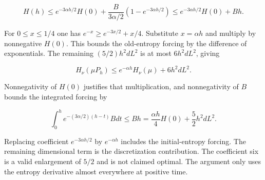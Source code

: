 \documentclass[11pt,a4paper]{report}
\begin{document}
\[H(h)\le e^{-3\alpha h/2}H(0)+\frac B{3\alpha/2}(1-e^{-3\alpha h/2})
\le e^{-3\alpha h/2}H(0)+Bh.\]

For \(0\le x\le1/4\) one has \(e^{-x}\ge e^{-3x/2}+x/4\). Substitute \(x=\alpha h\) and multiply by nonnegative \(H(0)\). This bounds the old-entropy forcing by the difference of exponentials. The remaining \((5/2)h^2dL^2\) is at most \(6h^2dL^2\), giving

\[\boxed{H_\nu(\mu P_h)\le e^{-\alpha h}H_\nu(\mu)+6h^2dL^2.}\]

Nonnegativity of \(H(0)\) justifies that multiplication, and nonnegativity of \(B\) bounds the integrated forcing by

\[\int_0^he^{-(3\alpha/2)(h-t)}Bdt\le Bh
=\frac{\alpha h}{4}H(0)+\frac52h^2dL^2.\]

Replacing coefficient \(e^{-3\alpha h/2}\) by \(e^{-\alpha h}\) includes the initial-entropy forcing. The remaining dimensional term is the discretization contribution. The coefficient six is a valid enlargement of \(5/2\) and is not claimed optimal. The argument only uses the entropy derivative almost everywhere at positive time.
\end{document}

